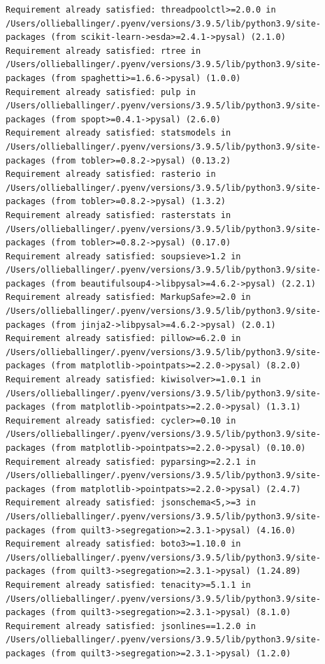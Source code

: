 \documentclass[
  letterpaper,
  DIV=11,
  numbers=noendperiod]{scrreprt}
\begin{document}
\begin{verbatim}
Requirement already satisfied: threadpoolctl>=2.0.0 in /Users/ollieballinger/.pyenv/versions/3.9.5/lib/python3.9/site-packages (from scikit-learn->esda>=2.4.1->pysal) (2.1.0)
Requirement already satisfied: rtree in /Users/ollieballinger/.pyenv/versions/3.9.5/lib/python3.9/site-packages (from spaghetti>=1.6.6->pysal) (1.0.0)
Requirement already satisfied: pulp in /Users/ollieballinger/.pyenv/versions/3.9.5/lib/python3.9/site-packages (from spopt>=0.4.1->pysal) (2.6.0)
Requirement already satisfied: statsmodels in /Users/ollieballinger/.pyenv/versions/3.9.5/lib/python3.9/site-packages (from tobler>=0.8.2->pysal) (0.13.2)
Requirement already satisfied: rasterio in /Users/ollieballinger/.pyenv/versions/3.9.5/lib/python3.9/site-packages (from tobler>=0.8.2->pysal) (1.3.2)
Requirement already satisfied: rasterstats in /Users/ollieballinger/.pyenv/versions/3.9.5/lib/python3.9/site-packages (from tobler>=0.8.2->pysal) (0.17.0)
Requirement already satisfied: soupsieve>1.2 in /Users/ollieballinger/.pyenv/versions/3.9.5/lib/python3.9/site-packages (from beautifulsoup4->libpysal>=4.6.2->pysal) (2.2.1)
Requirement already satisfied: MarkupSafe>=2.0 in /Users/ollieballinger/.pyenv/versions/3.9.5/lib/python3.9/site-packages (from jinja2->libpysal>=4.6.2->pysal) (2.0.1)
Requirement already satisfied: pillow>=6.2.0 in /Users/ollieballinger/.pyenv/versions/3.9.5/lib/python3.9/site-packages (from matplotlib->pointpats>=2.2.0->pysal) (8.2.0)
Requirement already satisfied: kiwisolver>=1.0.1 in /Users/ollieballinger/.pyenv/versions/3.9.5/lib/python3.9/site-packages (from matplotlib->pointpats>=2.2.0->pysal) (1.3.1)
Requirement already satisfied: cycler>=0.10 in /Users/ollieballinger/.pyenv/versions/3.9.5/lib/python3.9/site-packages (from matplotlib->pointpats>=2.2.0->pysal) (0.10.0)
Requirement already satisfied: pyparsing>=2.2.1 in /Users/ollieballinger/.pyenv/versions/3.9.5/lib/python3.9/site-packages (from matplotlib->pointpats>=2.2.0->pysal) (2.4.7)
Requirement already satisfied: jsonschema<5,>=3 in /Users/ollieballinger/.pyenv/versions/3.9.5/lib/python3.9/site-packages (from quilt3->segregation>=2.3.1->pysal) (4.16.0)
Requirement already satisfied: boto3>=1.10.0 in /Users/ollieballinger/.pyenv/versions/3.9.5/lib/python3.9/site-packages (from quilt3->segregation>=2.3.1->pysal) (1.24.89)
Requirement already satisfied: tenacity>=5.1.1 in /Users/ollieballinger/.pyenv/versions/3.9.5/lib/python3.9/site-packages (from quilt3->segregation>=2.3.1->pysal) (8.1.0)
Requirement already satisfied: jsonlines==1.2.0 in /Users/ollieballinger/.pyenv/versions/3.9.5/lib/python3.9/site-packages (from quilt3->segregation>=2.3.1->pysal) (1.2.0)

\end{verbatim}
\end{document}
